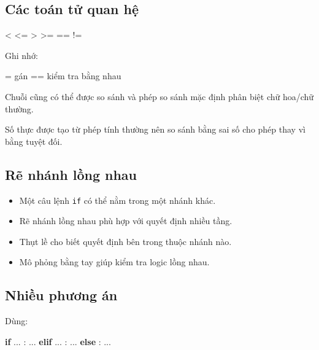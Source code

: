 \documentclass[
  11pt,
  a4paper,
]{article}
\newenvironment{Shaded}{}{}
\newcommand{\ControlFlowTok}[1]{\textcolor[rgb]{0.00,0.44,0.13}{\textbf{#1}}}
\newcommand{\NormalTok}[1]{#1}
\newcommand{\OperatorTok}[1]{\textcolor[rgb]{0.40,0.40,0.40}{#1}}
\providecommand{\tightlist}{%
  \setlength{\itemsep}{0pt}\setlength{\parskip}{0pt}}
\begin{document}
\subsection{Các toán tử quan
hệ}\label{cuxe1c-touxe1n-tux1eed-quan-hux1ec7-2}

\begin{Shaded}
\begin{Highlighting}[]
\OperatorTok{\textless{}}  \OperatorTok{\textless{}=}  \OperatorTok{\textgreater{}}  \OperatorTok{\textgreater{}=}  \OperatorTok{==}  \OperatorTok{!=}
\end{Highlighting}
\end{Shaded}

Ghi nhớ:

\begin{Shaded}
\begin{Highlighting}[]
\NormalTok{=   gán}
\NormalTok{==  kiểm tra bằng nhau}
\end{Highlighting}
\end{Shaded}

Chuỗi cũng có thể được so sánh và phép so sánh mặc định phân biệt chữ
hoa/chữ thường.

Số thực được tạo từ phép tính thường nên so sánh bằng sai số cho phép
thay vì bằng tuyệt đối.

\subsection{Rẽ nhánh lồng nhau}\label{rux1ebd-nhuxe1nh-lux1ed3ng-nhau-1}

\begin{itemize}
\tightlist
\item
  Một câu lệnh \texttt{if} có thể nằm trong một nhánh khác.
\item
  Rẽ nhánh lồng nhau phù hợp với quyết định nhiều tầng.
\item
  Thụt lề cho biết quyết định bên trong thuộc nhánh nào.
\item
  Mô phỏng bằng tay giúp kiểm tra logic lồng nhau.
\end{itemize}

\subsection{Nhiều phương án}\label{nhiux1ec1u-phux1b0ux1a1ng-uxe1n-2}

Dùng:

\begin{Shaded}
\begin{Highlighting}[]
\ControlFlowTok{if}\NormalTok{ ... :}
\NormalTok{    ...}
\ControlFlowTok{elif}\NormalTok{ ... :}
\NormalTok{    ...}
\ControlFlowTok{else}\NormalTok{ :}
\NormalTok{    ...}
\end{Highlighting}
\end{Shaded}
\end{document}
